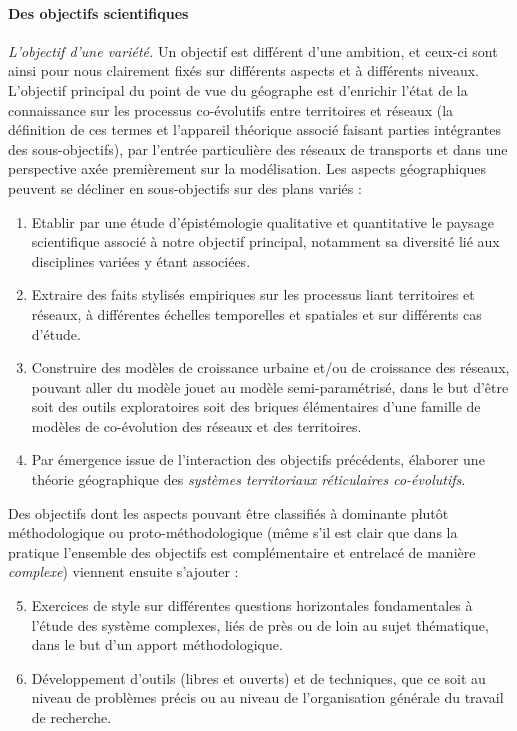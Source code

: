 \paragraph{Des objectifs scientifiques}


\emph{L'objectif d'une variété.} Un objectif est différent d'une ambition, et ceux-ci sont ainsi pour nous clairement fixés sur différents aspects et à différents niveaux. L'objectif principal du point de vue du géographe est d'enrichir l'état de la connaissance sur les processus co-évolutifs entre territoires et réseaux (la définition de ces termes et l'appareil théorique associé faisant parties intégrantes des sous-objectifs), par l'entrée particulière des réseaux de transports et dans une perspective axée premièrement sur la modélisation. Les aspects géographiques peuvent se décliner en sous-objectifs sur des plans variés :
\begin{enumerate}
\item Etablir par une étude d'épistémologie qualitative et quantitative le paysage scientifique associé à notre objectif principal, notamment sa diversité lié aux disciplines variées y étant associées.
\item Extraire des faits stylisés empiriques sur les processus liant territoires et réseaux, à différentes échelles temporelles et spatiales et sur différents cas d'étude.
\item Construire des modèles de croissance urbaine et/ou de croissance des réseaux, pouvant aller du modèle jouet au modèle semi-paramétrisé, dans le but d'être soit des outils exploratoires soit des briques élémentaires d'une famille de modèles de co-évolution des réseaux et des territoires.
\item Par émergence issue de l'interaction des objectifs précédents, élaborer une théorie géographique des \emph{systèmes territoriaux réticulaires co-évolutifs}.
\end{enumerate} 

Des objectifs dont les aspects pouvant être classifiés à dominante plutôt méthodologique ou proto-méthodologique (même s'il est clair que dans la pratique l'ensemble des objectifs est complémentaire et entrelacé de manière \emph{complexe}) viennent ensuite s'ajouter : 

\begin{enumerate}\setcounter{enumi}{4}
\item Exercices de style sur différentes questions horizontales fondamentales à l'étude des système complexes, liés de près ou de loin au sujet thématique, dans le but d'un apport méthodologique.
\item Développement d'outils (libres et ouverts) et de techniques, que ce soit au niveau de problèmes précis ou au niveau de l'organisation générale du travail de recherche.
\end{enumerate}

